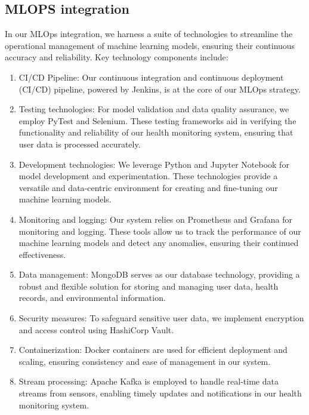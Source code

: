 \documentclass[12pt]{article}
\begin{document}
\subsection{MLOPS integration}
In our MLOps integration, we harness a suite of technologies to streamline the operational management of machine learning models, ensuring their continuous accuracy and reliability. Key technology components include:
\begin{enumerate}
\item CI/CD Pipeline: Our continuous integration and continuous deployment (CI/CD) pipeline, powered by Jenkins, is at the core of our MLOps strategy. 

\item Testing technologies: For model validation and data quality assurance, we employ PyTest and Selenium. These testing frameworks aid in verifying the functionality and reliability of our health monitoring system, ensuring that user data is processed accurately.

\item Development technologies: We leverage Python and Jupyter Notebook for model development and experimentation. These technologies provide a versatile and data-centric environment for creating and fine-tuning our machine learning models.

\item Monitoring and logging: Our system relies on Prometheus and Grafana for monitoring and logging. These tools allow us to track the performance of our machine learning models and detect any anomalies, ensuring their continued effectiveness.

\item Data management: MongoDB serves as our database technology, providing a robust and flexible solution for storing and managing user data, health records, and environmental information.
\item Security measures: To safeguard sensitive user data, we implement encryption and access control using HashiCorp Vault.
\item Containerization: Docker containers are used for efficient deployment and scaling, ensuring consistency and ease of management in our system.
\item Stream processing: Apache Kafka is employed to handle real-time data streams from sensors, enabling timely updates and notifications in our health monitoring system.

\end{enumerate}
\end{document}
